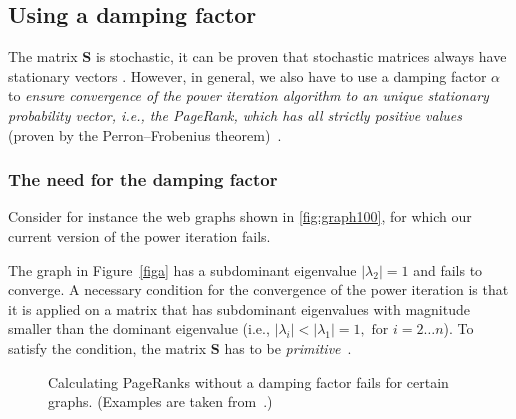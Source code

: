 \documentclass[a4paper,english,11pt]{scrartcl}
\renewcommand{\vec}[1]{\mathbf{#1}}
\begin{document}
\subsection{Using a damping factor}
The matrix $\vec{S}$ is stochastic, it can be proven that stochastic matrices always have stationary vectors \cite{stationary}. 
However, in general, we also have to use a damping factor $\alpha$ to \emph{ensure convergence of the power iteration algorithm to an unique stationary probability vector, i.e., the PageRank, which has all strictly positive values} (proven by the Perron–Frobenius theorem)~\cite{ams,Langville:2006:GPB:1146372,math}.

\subsubsection*{The need for the damping factor}
Consider for instance the web graphs shown in \autoref{fig:graph100}, for which our current version of the power iteration fails. 

The graph in Figure~\ref{figa} has a subdominant eigenvalue $|\lambda_2|=1$ and fails to converge. 
A necessary condition for the convergence of the power iteration is that it is applied on a matrix that has subdominant eigenvalues with magnitude smaller than the dominant eigenvalue  (i.e., $|\lambda_i|<|\lambda_1|=1, \textrm{ for }i =2\ldots n$). To satisfy the condition, the matrix $\vec{S}$ has to be \emph{primitive}~\cite{ams}.

\begin{figure}[Hbpt]
\centering
\caption{Calculating PageRanks without a damping factor fails for certain graphs. (Examples are taken from~\cite{ams}.)}
\label{fig:graph100}
\end{figure}
\end{document}
